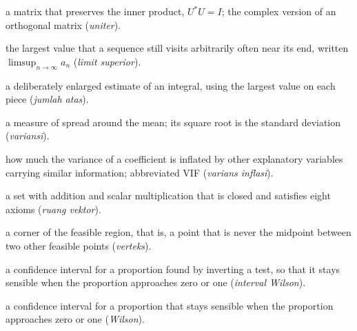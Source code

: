 \begin{description}[style=nextline,itemsep=0.35em]
  \item[Unitary] a matrix that preserves the inner product, $U^{*}U=I$; the complex version of an orthogonal matrix (\emph{uniter}).
  \item[Upper limit] the largest value that a sequence still visits arbitrarily often near its end, written $\limsup_{n\to\infty}a_n$ (\emph{limit superior}).
  \item[Upper sum] a deliberately enlarged estimate of an integral, using the largest value on each piece (\emph{jumlah atas}).
  \item[Variance] a measure of spread around the mean; its square root is the standard deviation (\emph{variansi}).
  \item[Variance inflation factor] how much the variance of a coefficient is inflated by other explanatory variables carrying similar information; abbreviated VIF (\emph{varians inflasi}).
  \item[Vector space] a set with addition and scalar multiplication that is closed and satisfies eight axioms (\emph{ruang vektor}).
  \item[Vertex] a corner of the feasible region, that is, a point that is never the midpoint between two other feasible points (\emph{verteks}).
  \item[Wilson interval] a confidence interval for a proportion found by inverting a test, so that it stays sensible when the proportion approaches zero or one (\emph{interval Wilson}).
  \item[Wilson interval] a confidence interval for a proportion that stays sensible when the proportion approaches zero or one (\emph{Wilson}).
\end{description}
